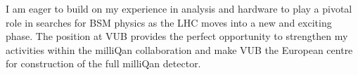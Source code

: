 \documentclass[11pt]{article}
\theoremstyle{plain} \numberwithin{equation}{section}
\theoremstyle{definition}
\begin{document}
 I am eager to build on my experience in analysis and hardware to play 
 a pivotal role in searches for BSM physics as the LHC
 moves into a new and exciting phase. The position at VUB provides the perfect opportunity to
 strengthen my activities within the milliQan collaboration and make VUB the European centre
 for construction of the full milliQan detector.
 
\end{document}

